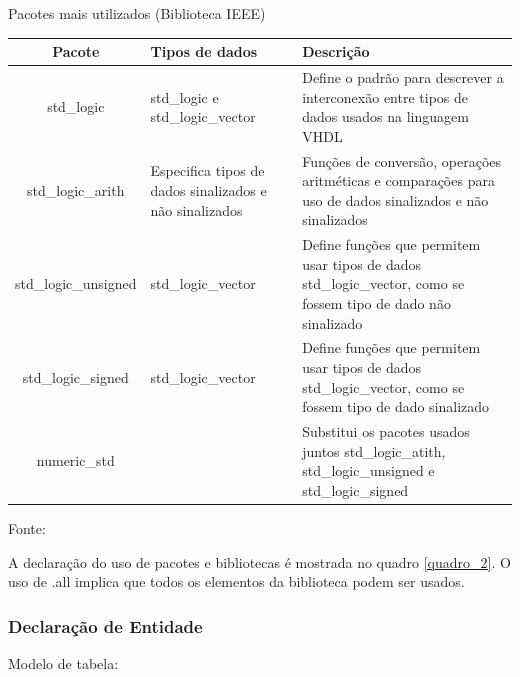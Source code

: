 \begin{quadro}[h]
    \caption{Pacotes mais utilizados (Biblioteca IEEE)}
    \label{quadro_1}
    \centering
     \begin{tabular}{|c|p{3cm}|p{8cm}|}
      \hline
      \textbf{Pacote} & \textbf{Tipos de dados} & \textbf{Descrição} \\
      \hline
      std\_logic & std\_logic e std\_logic\_vector & Define o padrão para descrever a interconexão entre tipos de dados usados na linguagem VHDL \\
      \hline
       std\_logic\_arith & Especifica tipos de dados sinalizados e não sinalizados & Funções de conversão, operações aritméticas e comparações para uso de dados sinalizados e não sinalizados \\
      \hline
       std\_logic\_unsigned & std\_logic\_vector & Define funções que permitem usar tipos de dados std\_logic\_vector, como se fossem tipo de dado não sinalizado \\
      \hline
       std\_logic\_signed & std\_logic\_vector & Define funções que permitem usar tipos de dados std\_logic\_vector, como se fossem tipo de dado sinalizado \\
      \hline
       numeric\_std & & Substitui os pacotes usados juntos std\_logic\_atith, std\_logic\_unsigned e std\_logic\_signed \\
      \hline                 
    \end{tabular}
  \vspace{1.5pt}
  \caption*{\footnotesize Fonte: \cite{ordonez2003projeto}}
\end{quadro}

A declaração do uso de pacotes e bibliotecas é mostrada no quadro \ref{quadro_2}. O uso de .all implica que todos os elementos da biblioteca podem ser usados.

\subsubsection{Declaração de Entidade}

Modelo de tabela:

